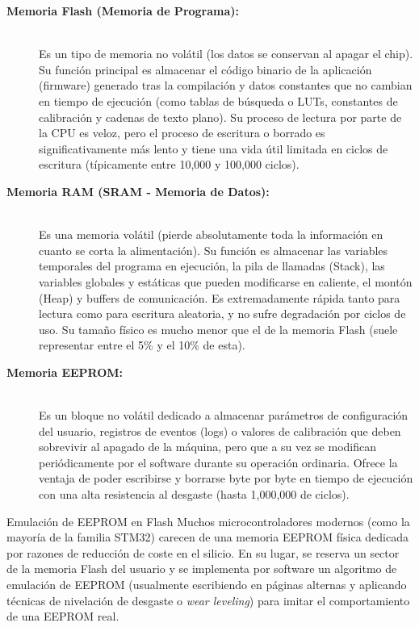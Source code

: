 \documentclass[
10pt, %
a4paper, %
oneside, %
headinclude,footinclude, %
BCOR5mm, %
]{scrartcl}
\begin{document}
\begin{description}
	\item[\textbf{Memoria Flash (Memoria de Programa):}]~\\
	Es un tipo de memoria no volátil (los datos se conservan al apagar el chip). Su función principal es almacenar el código binario de la aplicación (firmware) generado tras la compilación y datos constantes que no cambian en tiempo de ejecución (como tablas de búsqueda o LUTs, constantes de calibración y cadenas de texto plano). Su proceso de lectura por parte de la CPU es veloz, pero el proceso de escritura o borrado es significativamente más lento y tiene una vida útil limitada en ciclos de escritura (típicamente entre 10,000 y 100,000 ciclos).
	
	\item[\textbf{Memoria RAM (SRAM - Memoria de Datos):}]~\\
	Es una memoria volátil (pierde absolutamente toda la información en cuanto se corta la alimentación). Su función es almacenar las variables temporales del programa en ejecución, la pila de llamadas (Stack), las variables globales y estáticas que pueden modificarse en caliente, el montón (Heap) y buffers de comunicación. Es extremadamente rápida tanto para lectura como para escritura aleatoria, y no sufre degradación por ciclos de uso. Su tamaño físico es mucho menor que el de la memoria Flash (suele representar entre el 5\% y el 10\% de esta).
	
	\item[\textbf{Memoria EEPROM:}]~\\
	Es un bloque no volátil dedicado a almacenar parámetros de configuración del usuario, registros de eventos (logs) o valores de calibración que deben sobrevivir al apagado de la máquina, pero que a su vez se modifican periódicamente por el software durante su operación ordinaria. Ofrece la ventaja de poder escribirse y borrarse byte por byte en tiempo de ejecución con una alta resistencia al desgaste (hasta 1,000,000 de ciclos).
\end{description}

\begin{InfoBox}{Emulación de EEPROM en Flash}
	Muchos microcontroladores modernos (como la mayoría de la familia STM32) carecen de una memoria EEPROM física dedicada por razones de reducción de coste en el silicio. En su lugar, se reserva un sector de la memoria Flash del usuario y se implementa por software un algoritmo de emulación de EEPROM (usualmente escribiendo en páginas alternas y aplicando técnicas de nivelación de desgaste o \textit{wear leveling}) para imitar el comportamiento de una EEPROM real.
\end{InfoBox}
\end{document}
